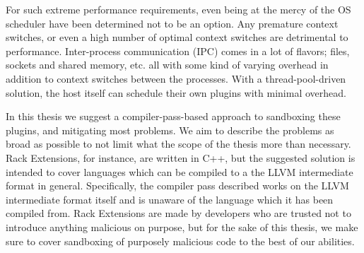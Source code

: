 For such extreme performance requirements, even being at the mercy of the OS
scheduler have been determined not to be an option. Any premature context
switches, or even a high  number of optimal context switches are detrimental to
performance. Inter-process communication (IPC) comes in a lot of flavors; files,
sockets and shared memory, etc. all with some kind of varying overhead in
addition to context switches between the processes. With a thread-pool-driven
solution, the host itself can schedule their own plugins with minimal overhead.

In this thesis we suggest a compiler-pass-based approach to sandboxing these
plugins, and mitigating most problems. We aim to describe the problems as broad
as possible to not limit what the scope of the thesis more than necessary. Rack
Extensions, for instance, are written in C++, but the suggested solution is
intended to cover languages which can be compiled to a the LLVM intermediate
format in general. Specifically, the compiler pass described works on the LLVM
intermediate format itself and is unaware of the language which it has been 
compiled from. Rack Extensions are made by developers who are trusted not to
introduce anything malicious on purpose, but for the sake of this thesis, we
make sure to cover sandboxing of purposely malicious code to the best of our
abilities.
